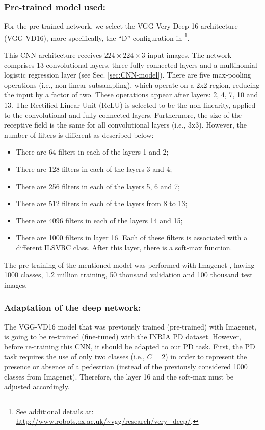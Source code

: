 \documentclass[5p,time]{elsarticle}
\begin{document}
\subsubsection{Pre-trained model used:}
For the pre-trained network, we select the VGG Very Deep 16 architecture (VGG-VD16), more specifically, the  ``D'' configuration in \cite{SimonyanICLR2015}\footnote{See additional details at: \url{http://www.robots.ox.ac.uk/~vgg/research/very_deep/}.}.

This CNN architecture receives $224\times 224\times 3$ input images. The network comprises 13 convolutional layers, three fully connected layers and a multinomial logistic regression layer (see Sec. \ref{sec:CNN-model}). There are five max-pooling operations (i.e., non-linear subsampling), which operate on a 2x2 region, reducing the input by a factor of two. These operations appear after layers: 2, 4, 7, 10 and 13. The Rectified Linear Unit (ReLU) is selected to be the non-linearity, applied to the convolutional and fully connected layers. Furthermore, the size of the receptive field is the same for all convolutional layers (i.e., 3x3). However, the number of filters is different as described below:
\begin{itemize}
	\item{There are   64 filters in each of the layers 1 and 2;} 
	\item{There are  128 filters in each of the layers 3 and 4;} 
	\item{There are  256 filters in each of the layers 5, 6 and 7;} 
	\item{There are  512 filters in each of the layers from 8 to 13;} 
	\item{There are 4096 filters in each of the layers 14 and 15;} 
	\item{There are 1000 filters in layer 16. Each of these filters is associated with a different ILSVRC \cite{RussakovskyIJCV2015} class. After this layer, there is a soft-max function.} 
\end{itemize}
The pre-training of the mentioned model was performed with Imagenet \cite{RussakovskyIJCV2015}, having 1000 classes, 1.2 million training, 50 thousand validation and 100 thousand test images.


\subsubsection{Adaptation of the deep network:}\label{sec:Adaptation-of-the-deep-network}
 
The VGG-VD16 model that was previously trained (pre-trained) with Imagenet, is going to be re-trained (fine-tuned) with the INRIA PD dataset. However, before re-training this CNN, it should be adapted to our PD task. First, the PD task requires the use of only two classes (i.e., $C=2$) in order to represent the presence or absence of a pedestrian (instead of the previously considered 1000 classes from Imagenet). Therefore, the layer 16 and the soft-max must be adjusted accordingly.
\end{document}
